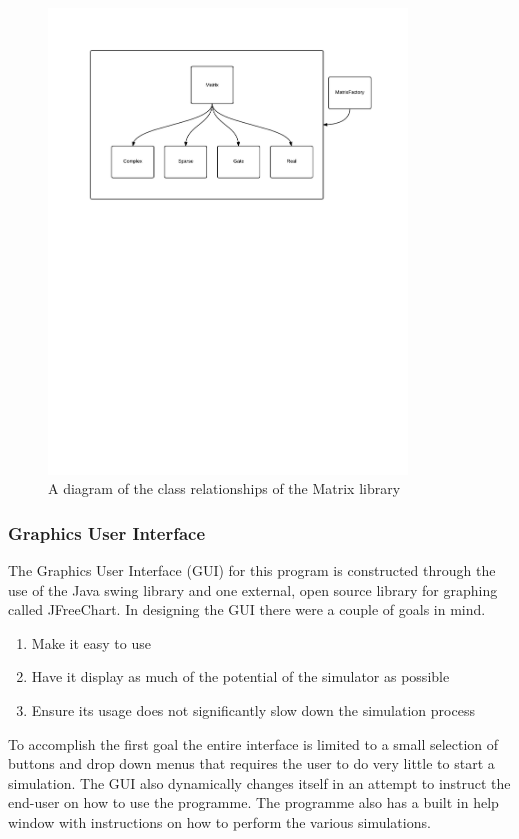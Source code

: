 \documentclass[bibliography=totocnumbered, 10pt]{article}
\theoremstyle{NoticeStyle}
\begin{document}
\begin{figure}[H]
\centering
\includegraphics[width=0.85\textwidth]{img/MatrixDesign.pdf}
\caption{A diagram of the class relationships of the Matrix library}
\end{figure}

\subsubsection{Graphics User Interface}
The Graphics User Interface (GUI) for this program is constructed through the use of the Java swing library and one external, open source library for graphing called JFreeChart. In designing the GUI there were a couple of goals in mind. 
\begin{enumerate}
	\item Make it easy to use
	\item Have it display as much of the potential of the simulator as possible
	\item Ensure its usage does not significantly slow down the simulation process
\end{enumerate}
To accomplish the first goal the entire interface is limited to a small selection of buttons and drop down menus that requires the user to do very little to start a simulation. The GUI also dynamically changes itself in an attempt to instruct the end-user on how to use the programme. The programme also has a built in help window with instructions on how to perform the various simulations.
\end{document}
